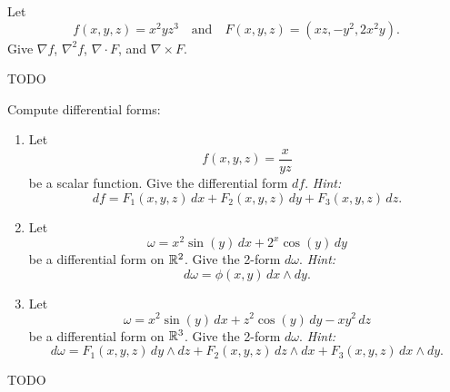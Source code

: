\documentclass[11pt]{article}
\begin{document}
\begin{exercise}
	Let
	$$
		f(x,y,z) = x^2 y z^3 \quad \text{and} \quad F(x,y,z) = (xz, -y^2, 2x^2 y).
	$$
	Give $\nabla f$, $\nabla^2 f$, $\nabla \cdot F$, and $\nabla \times F$.
\end{exercise}

\begin{solution}
	TODO
\end{solution}

\begin{exercise}
	Compute differential forms:
	\begin{enumerate}
		\item Let
		      $$
			      f(x,y,z) = \frac{x}{yz}
		      $$
		      be a scalar function. Give the differential form $df$.
		      \newline \emph{Hint:}
		      $$
			      df = F_1(x,y,z) \, dx + F_2(x,y,z) \, dy + F_3(x,y,z) \, dz.
		      $$
		\item Let
		      $$
			      \omega = x^2 \sin(y) \, dx + 2^x \cos(y) \, dy
		      $$
		      be a differential form on $\mathbb{R}^2$. Give the 2-form $d\omega$.
		      \newline \emph{Hint:}
		      $$
			      d\omega = \phi(x,y) \, dx \wedge dy.
		      $$
		\item Let
		      $$
			      \omega = x^2 \sin(y) \, dx + z^2 \cos(y) \, dy - xy^2 \, dz
		      $$
		      be a differential form on $\mathbb{R}^3$. Give the 2-form $d\omega$.
		      \newline \emph{Hint:}
		      $$
			      d\omega = F_1(x,y,z) \, dy \wedge dz + F_2(x,y,z) \, dz \wedge dx + F_3(x,y,z) \, dx \wedge dy.
		      $$
	\end{enumerate}
\end{exercise}

\begin{solution}
	TODO
\end{solution}
\end{document}
